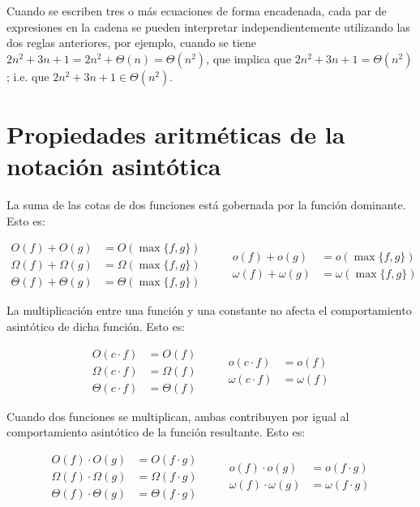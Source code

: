 Cuando se escriben tres o más ecuaciones de forma encadenada, cada par de expresiones
en la cadena se pueden interpretar independientemente utilizando las dos reglas anteriores,
por ejemplo, cuando se tiene $2n^2+3n+1=2n^2+\Theta(n)=\Theta(n^2)$, que implica que
$2n^2+3n+1=\Theta(n^2)$; i.e. que $2n^2+3n+1\in\Theta(n^2)$.

\section{Propiedades aritméticas de la notación asintótica}

La suma de las cotas de dos funciones está gobernada por la función
dominante. Esto es:

\[
\begin{aligned}
    O(f)+O(g) &= O(\max\{f,g\})\\
    \Omega(f)+\Omega(g) &= \Omega(\max\{f,g\})\\
    \Theta(f)+\Theta(g) &= \Theta(\max\{f,g\})
\end{aligned}
\qquad
\begin{aligned}
    o(f)+o(g) &= o(\max\{f,g\})\\
    \omega(f)+\omega(g) &= \omega(\max\{f,g\})
\end{aligned}
\]

La multiplicación entre una función y una constante no afecta el
comportamiento asintótico de dicha función. Esto es:

\[
\begin{aligned}
    O(c\cdot f) &= O(f)\\
    \Omega(c\cdot f) &= \Omega(f)\\
    \Theta(c\cdot f) &= \Theta(f)
\end{aligned}
\qquad
\begin{aligned}
    o(c\cdot f) &= o(f)\\
    \omega(c\cdot f) &= \omega(f)
\end{aligned}
\]

Cuando dos funciones se multiplican, ambas contribuyen por igual al
comportamiento asintótico de la función resultante. Esto es:

\[
\begin{aligned}
    O(f)\cdot O(g) &= O(f\cdot g)\\
    \Omega(f)\cdot\Omega(g) &= \Omega(f\cdot g)\\
    \Theta(f)\cdot\Theta(g) &= \Theta(f\cdot g)
\end{aligned}
\qquad
\begin{aligned}
    o(f)\cdot o(g) &= o(f\cdot g)\\
    \omega(f)\cdot\omega(g) &= \omega(f\cdot g)
\end{aligned}
\]

